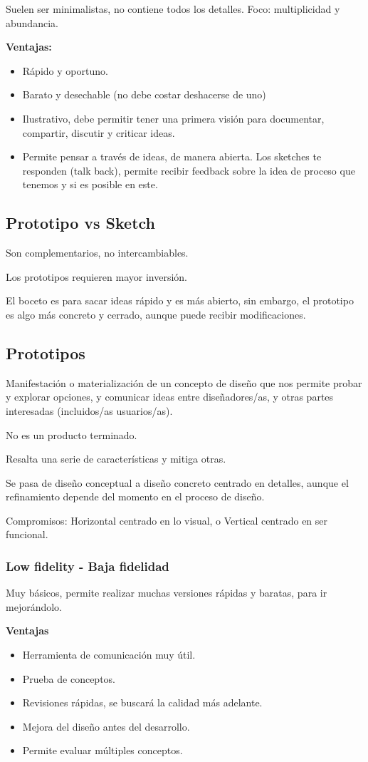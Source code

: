 \documentclass[12pt]{report} %
\begin{document}
Suelen ser minimalistas, no contiene todos los detalles. Foco: multiplicidad y abundancia.

\textbf{Ventajas:}
\begin{itemize}
  \item Rápido y oportuno.
  \item Barato y desechable (no debe costar deshacerse de uno)
  \item Ilustrativo, debe permitir tener una primera visión para documentar, compartir, discutir y criticar ideas.
  \item Permite pensar a través de ideas, de manera abierta. Los sketches te responden (talk back), permite recibir feedback sobre la idea de proceso que tenemos y si es posible en este.
\end{itemize}

\subsection{Prototipo vs Sketch}
Son complementarios, no intercambiables.

Los prototipos requieren mayor inversión.

El boceto es para sacar ideas rápido y es más abierto, sin embargo, el prototipo es algo más concreto y cerrado, aunque puede recibir modificaciones.

\subsection{Prototipos}
Manifestación o materialización de un concepto de diseño que nos permite probar y explorar opciones, y comunicar ideas entre diseñadores/as, y otras partes interesadas (incluidos/as usuarios/as).

No es un producto terminado.

Resalta una serie de características y mitiga otras.

Se pasa de diseño conceptual a diseño concreto centrado en detalles, aunque el refinamiento depende del momento en el proceso de diseño.

Compromisos: Horizontal centrado en lo visual, o Vertical centrado en ser funcional.
\subsubsection{Low fidelity - Baja fidelidad}
Muy básicos, permite realizar muchas versiones rápidas y baratas, para ir mejorándolo.
  
\textbf{Ventajas}
  \begin{itemize}
    \item Herramienta de comunicación muy útil.
    \item Prueba de conceptos.
    \item Revisiones rápidas, se buscará la calidad más adelante.
    \item Mejora del diseño antes del desarrollo.
    \item Permite evaluar múltiples conceptos.
  \end{itemize}
\end{document}
